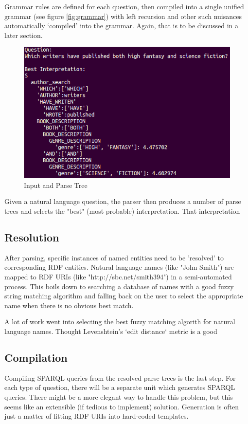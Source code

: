 \documentclass[11pt]{article}
\begin{document}
Grammar rules are defined for each question, then compiled into a single
unified grammar (see figure \ref{fig:grammar}) with left recursion and other such 
nuisances automatically `compiled' into the grammar. 
Again, that is to be discussed in a later section.

\begin{figure}[h!]
    \centering
    \includegraphics[scale=1.0,natwidth=1,natheight=1]{imgs/demo/parse.png}
    \caption{Input and Parse Tree}
    \label{fig:parse}
\end{figure}

Given a natural language question, the parser then produces a number of
parse trees and selects the "best" (most probable) interpretation. That
interpretation 

\subsection{Resolution}
After parsing, specific instances of named entities need to be 'resolved' to
corresponding RDF entities. Natural language names (like "John Smith") are mapped
to RDF URIs (like "http://sbc.net/smith394")
in a semi-automated process. This boils down to searching a
database of names with a good fuzzy string matching algorithm and falling
back on the user to select the appropriate name when there is no obvious best 
match.

A lot of work went into selecting the best fuzzy matching algorith for
natural language names. Thought Levenshtein's `edit distance` metric
is a good 

\subsection{Compilation}
Compiling SPARQL queries from the resolved parse trees is the last step.
For each type of question, there will be a separate unit which 
generates SPARQL queries. There might be a more elegant way to handle this
problem, but this seems like an extensible (if tedious to implement) solution.
Generation is often just a matter of fitting RDF URIs into hard-coded templates.
\end{document}
